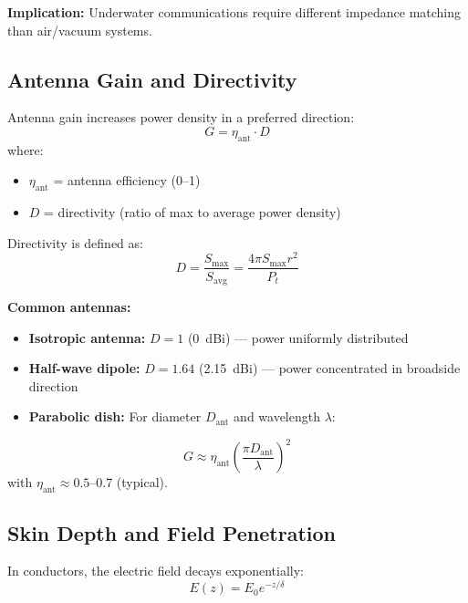 \textbf{Implication:} Underwater communications require different impedance matching than air/vacuum systems.

\subsection{Antenna Gain and Directivity}

Antenna gain increases power density in a preferred direction:
\begin{equation}
G = \eta_{\text{ant}} \cdot D
\label{eq:antenna-gain}
\end{equation}
where:
\begin{itemize}
\item $\eta_{\text{ant}}$ = antenna efficiency (0--1)
\item $D$ = directivity (ratio of max to average power density)
\end{itemize}

Directivity is defined as:
\begin{equation}
D = \frac{S_{\text{max}}}{S_{\text{avg}}} = \frac{4\pi S_{\text{max}} r^2}{P_t}
\label{eq:directivity}
\end{equation}

\textbf{Common antennas:}
\begin{itemize}
\item \textbf{Isotropic antenna:} $D = 1$ (0~dBi) --- power uniformly distributed
\item \textbf{Half-wave dipole:} $D = 1.64$ (2.15~dBi) --- power concentrated in broadside direction
\item \textbf{Parabolic dish:} For diameter $D_{\text{ant}}$ and wavelength $\lambda$:
\end{itemize}
\begin{equation}
G \approx \eta_{\text{ant}} \left(\frac{\pi D_{\text{ant}}}{\lambda}\right)^2
\label{eq:parabolic-gain}
\end{equation}
with $\eta_{\text{ant}} \approx 0.5$--0.7 (typical).

\subsection{Skin Depth and Field Penetration}

In conductors, the electric field decays exponentially:
\begin{equation}
E(z) = E_0 e^{-z/\delta}
\label{eq:skin-effect}
\end{equation}

